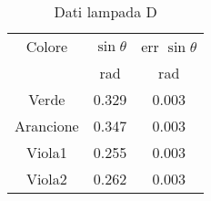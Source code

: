 \begin{table}[H]
\begin{center}
\caption{Dati lampada D}
\begin{tabular}{|c|cc|}
\hline
Colore	&	$\sin \theta$	&	err $\sin \theta$	\\
	&	rad	&	rad	\\ \hline
Verde	&	0.329	&	0.003	\\
Arancione	&	0.347	&	0.003	\\
Viola1	&	0.255	&	0.003	\\
Viola2	&	0.262	&	0.003	\\ \hline
\end{tabular}
\end{center}
\label{label}
\end{table}

